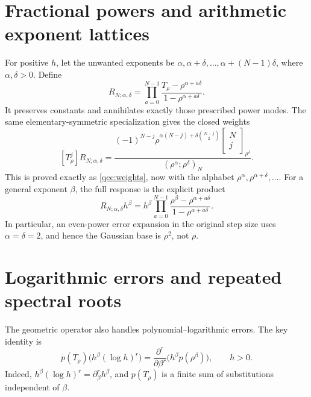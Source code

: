 \documentclass[11pt,a4paper,oneside,openany]{book}
\theoremstyle{definition}
\theoremstyle{remark}
\newcommand{\GB}[3][q]{\begin{bmatrix}#2\\#3\end{bmatrix}_{#1}}
\begin{document}
\section{Fractional powers and arithmetic exponent lattices}
For positive \(h\), let the unwanted exponents be
\(\alpha,\alpha+\delta,\ldots,\alpha+(N-1)\delta\), where
\(\alpha,\delta>0\). Define
\begin{equation}\label{qcc:general-filter}
 R_{N;\alpha,\delta}
 =\prod_{a=0}^{N-1}
       \frac{T_\rho-\rho^{\alpha+a\delta}}
            {1-\rho^{\alpha+a\delta}}.
\end{equation}
It preserves constants and annihilates exactly those prescribed power modes.
The same elementary-symmetric specialization gives the closed weights
\begin{equation}\label{qcc:general-weights}
 [T_\rho^j]R_{N;\alpha,\delta}
 =\frac{(-1)^{N-j}
        \rho^{\alpha(N-j)+\delta\binom{N-j}{2}}
        \GB[\rho^\delta]Nj}
       {(\rho^\alpha;\rho^\delta)_N}.
\end{equation}
This is proved exactly as \eqref{qcc:weights}, now with the alphabet
\(\rho^\alpha,\rho^{\alpha+\delta},\ldots\). For a general exponent
\(\beta\), the full response is the explicit product
\[
 R_{N;\alpha,\delta}h^\beta
  =h^\beta\prod_{a=0}^{N-1}
      \frac{\rho^\beta-\rho^{\alpha+a\delta}}
           {1-\rho^{\alpha+a\delta}}.
\]
In particular, an even-power error expansion in the original step size uses
\(\alpha=\delta=2\), and hence the Gaussian base is \(\rho^2\),
not \(\rho\).

\section{Logarithmic errors and repeated spectral roots}
The geometric operator also handles polynomial--logarithmic errors. The key
identity is
\begin{equation}\label{qcc:log-spectral-identity}
 p(T_\rho)\bigl(h^\beta(\log h)^r\bigr)
  =\frac{\partial^r}{\partial\beta^r}
            \bigl(h^\beta p(\rho^\beta)\bigr),\qquad h>0.
\end{equation}
Indeed, \(h^\beta(\log h)^r=\partial_\beta^rh^\beta\), and
\(p(T_\rho)\) is a finite sum of substitutions independent of \(\beta\).
\end{document}
